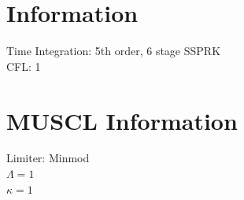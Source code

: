\documentclass[]{article}
\title{}
\author{}
\begin{document}
\section{Information}

Time Integration: 5th order, 6 stage SSPRK\\

CFL: 1\\

\section{MUSCL Information}

Limiter: Minmod\\

$\Lambda = 1$\\

$\kappa = 1$\\
\end{document}
